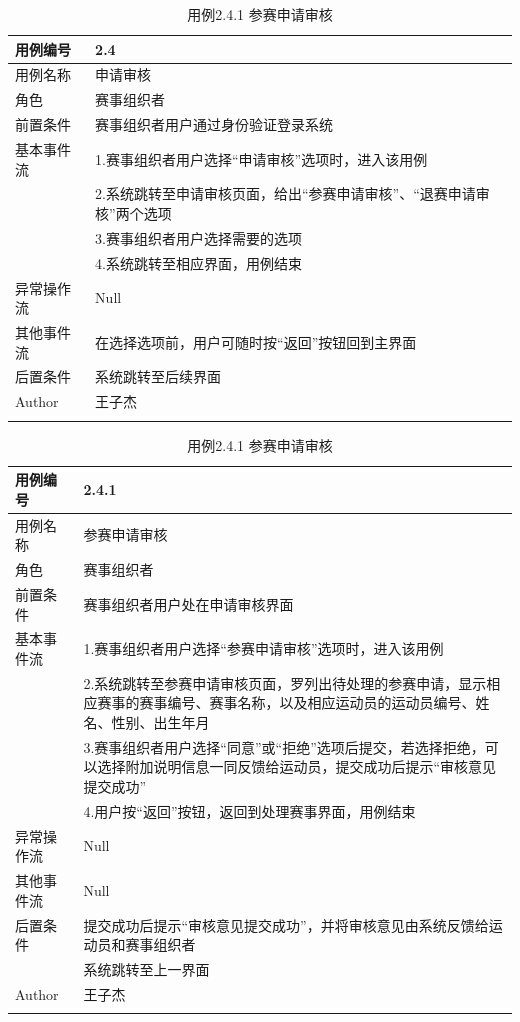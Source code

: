 \documentclass[a4paper,UTF8]{article}
\begin{document}
\begin{table}[H]
	\begin{center}
		\caption{用例2.4 申请审核}
		\label{table:Tab_uc24}
		\begin{tabular}{|p{}|p{}|}
			\hline\noalign{\smallskip}
			用例编号 & 2.4\\
			\hline
			用例名称 &  申请审核\\
			\hline
			角色 & 赛事组织者\\
			\hline
			前置条件 & 赛事组织者用户通过身份验证登录系统 \\
			\hline
			基本事件流 & 1.赛事组织者用户选择“申请审核”选项时，进入该用例 \\& 2.系统跳转至申请审核页面，给出“参赛申请审核”、“退赛申请审核”两个选项 \\& 3.赛事组织者用户选择需要的选项 \\& 4.系统跳转至相应界面，用例结束\\
			\hline
			异常操作流 & Null \\
			\hline
			其他事件流 & 在选择选项前，用户可随时按“返回”按钮回到主界面 \\
			\hline
			后置条件 & 系统跳转至后续界面 \\
			\hline
			Author & 王子杰 \\
			\noalign{\smallskip}
			\hline
			\noalign{\smallskip}
		\end{tabular}
		\caption{用例2.4.1 参赛申请审核}
		\label{table:Tab_uc241}
		\begin{tabular}{|p{}|p{}|}
			\hline\noalign{\smallskip}
			用例编号 & 2.4.1\\
			\hline
			用例名称 &  参赛申请审核\\
			\hline
			角色 & 赛事组织者\\
			\hline
			前置条件 & 赛事组织者用户处在申请审核界面 \\
			\hline
			基本事件流 & 1.赛事组织者用户选择“参赛申请审核”选项时，进入该用例 \\& 2.系统跳转至参赛申请审核页面，罗列出待处理的参赛申请，显示相应赛事的赛事编号、赛事名称，以及相应运动员的运动员编号、姓名、性别、出生年月 \\& 3.赛事组织者用户选择“同意”或“拒绝”选项后提交，若选择拒绝，可以选择附加说明信息一同反馈给运动员，提交成功后提示“审核意见提交成功” \\& 4.用户按“返回”按钮，返回到处理赛事界面，用例结束\\
			\hline
			异常操作流 & Null \\
			\hline
			其他事件流 & Null \\
			\hline
			后置条件 & 提交成功后提示“审核意见提交成功”，并将审核意见由系统反馈给运动员和赛事组织者\\& 系统跳转至上一界面 \\
			\hline
			Author & 王子杰 \\
			\noalign{\smallskip}
			\hline
			\noalign{\smallskip}
		\end{tabular}
	\end{center}
\end{table}
\end{document}
